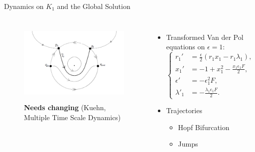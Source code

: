 \documentclass[11pt]{beamer}
\begin{document}
\begin{frame}{Dynamics on $K_1$ and the Global Solution}
\begin{columns}
	\begin{figure}
		\centering
\includegraphics[height=4cm,width=6cm]{Images/pres-cancard}
		\caption{\textbf{Needs changing} (Kuehn, Multiple Time Scale Dynamics)}
		
	\end{figure}
	\begin{itemize}
		\item Transformed Van der Pol equations on $ \epsilon=1$:
		\begin{equation*}
		\begin{cases}
			r_1'&=\frac{\epsilon}{2}(r_1x_1-r_1\lambda_1), \\
		x_1'&=-1+x_1^2-\frac{x_1\epsilon_1F}{2},\\
		\epsilon'&=-\epsilon_1^2F,\\
		\lambda'_1&=-\frac{\lambda_1\epsilon_1F}{2}.
		\end{cases}
		\end{equation*}
		\item Trajectories 
		\begin{itemize}
			\item Hopf Bifurcation
			\item Jumps
		\end{itemize}
		
	\end{itemize}
\end{columns}
\end{frame}
\end{document}
